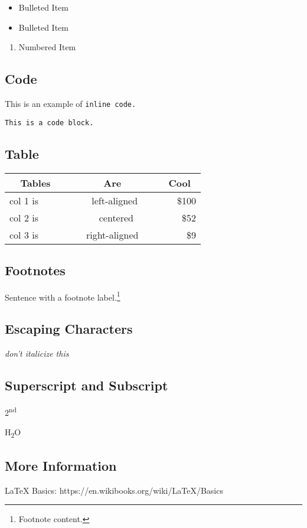 \begin{itemize}
\item
  Bulleted Item\\
\item
  Bulleted Item\\
\end{itemize}

\begin{enumerate}
\def\labelenumi{\arabic{enumi}.}
\setcounter{enumi}{1}
\item
  Numbered Item
\end{enumerate}

\subsection{Code}

This is an example of \texttt{inline\ code.}

\texttt{This\ is\ a\ code\ block.}

\subsection{Table}

\begin{longtable}[]{@{}lcr@{}}
\toprule
~~Tables~~ & ~~~~~~Are~~~~~~ & ~Cool~\tabularnewline
\midrule
\endhead
col 1 is & ~left-aligned & \$100\tabularnewline
col 2 is & ~~~ centered~~ & ~\$52\tabularnewline
col 3 is & right-aligned & ~~\$9\tabularnewline
\bottomrule
\end{longtable}

\subsection{Footnotes}

Sentence with a footnote label.\footnote{Footnote content.}

\subsection{Escaping Characters}

\emph{don't italicize this}

\subsection{Superscript and Subscript}

2\textsuperscript{nd}

H\textsubscript{2}O

\subsection{More Information}

LaTeX Basics: https://en.wikibooks.org/wiki/LaTeX/Basics
